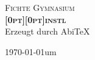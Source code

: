 \begin{titlepage}

\begin{center}



\textsc{\LARGE Fichte Gymnasium}\\[1.5cm]




\textsc{ \huge \bfseries \raisebox{0pt}[0pt][0pt]{inst\/\raisebox{-0.2ex}{A}\raisebox{-0.4ex}{B}\raisebox{0.1ex}{I}\/l}}
\vspace {1cm}
\\Erzeugt durch Abi\TeX



\vfill

{\large \today um \currenttime}

\end{center}

\end{titlepage}
